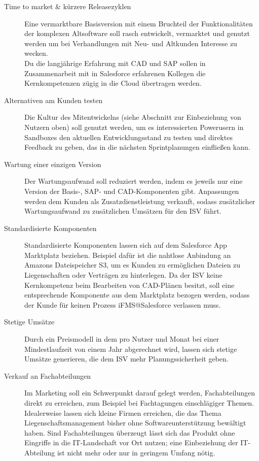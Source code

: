 \begin{description}
	\item[Time to market \& kürzere Releasezyklen] Eine vermarktbare 
Basisversion mit einem Bruchteil der Funktionalitäten der komplexen 
Altsoftware soll rasch entwickelt, vermarktet und genutzt werden um bei 
Verhandlungen mit Neu- und Altkunden Interesse zu wecken. \\
Du die langjährige Erfahrung mit CAD und SAP sollen in Zusammenarbeit mit in 
Salesforce erfahrenen Kollegen die Kernkompetenzen zügig in die Cloud 
übertragen werden.
	\item[Alternativen am Kunden testen] Die Kultur 
des Mitentwickelns (siehe Abschnitt zur Einbeziehung von Nutzern oben) soll 
genutzt werden, um es interessierten Powerusern in Sandboxes den aktuellen 
Entwicklungsstand zu testen und direktes Feedback zu geben, das in die nächsten 
Sprintplanungen einfließen kann.
	\item[Wartung einer einzigen Version] Der Wartungsaufwand soll 
reduziert werden, indem es jeweils nur eine Version der Basis-, SAP- und 
CAD-Komponenten gibt. Anpassungen werden dem Kunden als Zusatzdienstleistung 
verkauft, sodass zusätzlicher Wartungsaufwand zu zusätzlichen Umsätzen für den 
 ISV führt.
	\item[Standardisierte Komponenten] Standardisierte Komponenten lassen 
sich auf dem Salesforce App Marktplatz beziehen. Beispiel dafür ist die 
nahtlose Anbindung an Amazons Dateispeicher S3, um es Kunden zu ermöglichen 
Dateien zu Liegenschaften oder Verträgen zu hinterlegen. Da der ISV keine 
Kernkompetenz beim Bearbeiten von CAD-Plänen besitzt, soll eine entsprechende 
Komponente aus dem Marktplatz bezogen werden, sodass der Kunde für keinen 
Prozess iFMS@Salesforce verlassen muss.
	\item[Stetige Umsätze] Durch ein Preismodell in dem pro Nutzer und 
Monat bei einer Mindestlaufzeit von einem Jahr abgerechnet wird, lassen sich 
stetige Umsätze generieren, die dem ISV mehr Planungssicherheit geben.
	\item[Verkauf an Fachabteilungen] Im Marketing soll ein Schwerpunkt 
darauf gelegt werden, Fachabteilungen direkt zu erreichen, zum Beispiel bei 
Fachtagungen einschlägiger Themen. Idealerweise lassen sich kleine Firmen 
erreichen, die das Thema Liegenschaftsmanagement bisher ohne 
Softwareunterstützung bewältigt haben. Sind Fachabteilungen überzeugt lässt 
sich das Produkt ohne Eingriffe in die IT-Landschaft vor Ort nutzen; eine 
Einbeziehung der IT-Abteilung ist nicht mehr oder nur in geringem Umfang nötig.
\end{description}
